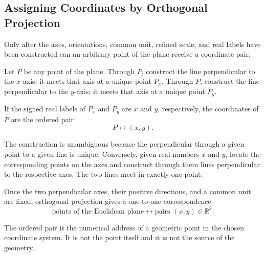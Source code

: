 \subsection{Assigning Coordinates by Orthogonal Projection}

\begin{corebox}
Only after the axes, orientations, common unit, refined scale, and real labels
have been constructed can an arbitrary point of the plane receive a coordinate
pair.
\end{corebox}

\begin{derivationbox}
Let $P$ be any point of the plane. Through $P$, construct the line perpendicular
to the $x$-axis; it meets that axis at a unique point $P_x$. Through $P$,
construct the line perpendicular to the $y$-axis; it meets that axis at a unique
point $P_y$.
\end{derivationbox}

\begin{center}
\end{center}

\begin{definitionbox}
If the signed real labels of $P_x$ and $P_y$ are $x$ and $y$, respectively, the
coordinates of $P$ are the ordered pair
\[
\boxed{P\longleftrightarrow(x,y)}.
\]
\end{definitionbox}

\begin{proofbox}
The construction is unambiguous because the perpendicular through a given point
to a given line is unique. Conversely, given real numbers $x$ and $y$, locate
the corresponding points on the axes and construct through them lines
perpendicular to the respective axes. The two lines meet in exactly one point.
\end{proofbox}

\begin{theorembox}
Once the two perpendicular axes, their positive directions, and a common unit
are fixed, orthogonal projection gives a one-to-one correspondence
\[
\boxed{
\text{points of the Euclidean plane}
\longleftrightarrow
\text{pairs }(x,y)\in\mathbb R^2
}.
\]
\end{theorembox}

\begin{interpretationbox}
The ordered pair is the numerical address of a geometric point in the chosen
coordinate system. It is not the point itself and it is not the source of the
geometry.
\end{interpretationbox}
